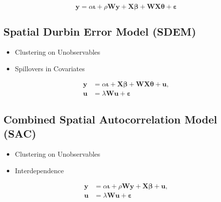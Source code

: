 \documentclass[
  letterpaper,
]{scrbook}
\providecommand{\tightlist}{%
  \setlength{\itemsep}{0pt}\setlength{\parskip}{0pt}}\usepackage{longtable,booktabs,array}
\begin{document}
\[
        {\boldsymbol{\mathbf{y}}}=\alpha{\boldsymbol{\mathbf{\iota}}}+\rho{\boldsymbol{\mathbf{W}}}{\boldsymbol{\mathbf{y}}}+{\boldsymbol{\mathbf{X}}}{\boldsymbol{\mathbf{\beta}}}+{\boldsymbol{\mathbf{W}}}{\boldsymbol{\mathbf{X}}}{\boldsymbol{\mathbf{\theta}}}+ {\boldsymbol{\mathbf{\varepsilon}}}
\]

\hypertarget{spatial-durbin-error-model-sdem}{%
\subsection{Spatial Durbin Error Model
(SDEM)}\label{spatial-durbin-error-model-sdem}}

\begin{itemize}
\tightlist
\item
  Clustering on Unobservables
\item
  Spillovers in Covariates
\end{itemize}

\[
        \begin{split}
        {\boldsymbol{\mathbf{y}}}&=\alpha{\boldsymbol{\mathbf{\iota}}}+{\boldsymbol{\mathbf{X}}}{\boldsymbol{\mathbf{\beta}}}+{\boldsymbol{\mathbf{W}}}{\boldsymbol{\mathbf{X}}}{\boldsymbol{\mathbf{\theta}}}+ {\boldsymbol{\mathbf{u}}},\\
        {\boldsymbol{\mathbf{u}}}&=\lambda{\boldsymbol{\mathbf{W}}}{\boldsymbol{\mathbf{u}}}+{\boldsymbol{\mathbf{\varepsilon}}}
        \end{split}
\]

\hypertarget{combined-spatial-autocorrelation-model-sac}{%
\subsection{Combined Spatial Autocorrelation Model
(SAC)}\label{combined-spatial-autocorrelation-model-sac}}

\begin{itemize}
\tightlist
\item
  Clustering on Unobservables
\item
  Interdependence
\end{itemize}

\[
        \begin{split}
        {\boldsymbol{\mathbf{y}}}&=\alpha{\boldsymbol{\mathbf{\iota}}}+\rho{\boldsymbol{\mathbf{W}}}{\boldsymbol{\mathbf{y}}}+{\boldsymbol{\mathbf{X}}}{\boldsymbol{\mathbf{\beta}}}+ {\boldsymbol{\mathbf{u}}},\\
        {\boldsymbol{\mathbf{u}}}&=\lambda{\boldsymbol{\mathbf{W}}}{\boldsymbol{\mathbf{u}}}+{\boldsymbol{\mathbf{\varepsilon}}}
        \end{split}
\]
\end{document}
